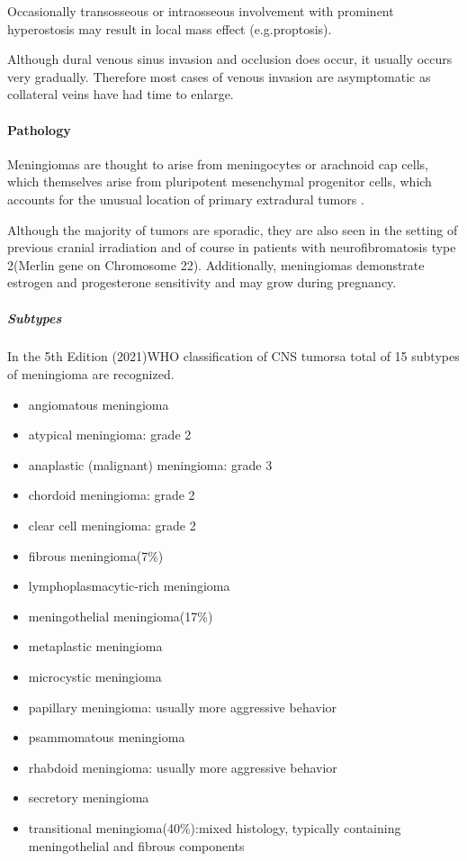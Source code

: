 Occasionally transosseous or intraosseous involvement with prominent hyperostosis may result in local mass effect (e.g.proptosis).

Although dural venous sinus invasion and occlusion does occur, it usually occurs very gradually. Therefore most cases of venous invasion are asymptomatic as collateral veins have had time to enlarge.


\paragraph{Pathology}

Meningiomas are thought to arise from meningocytes or arachnoid cap cells, which themselves arise from pluripotent mesenchymal progenitor cells, which accounts for the unusual location of primary extradural tumors .

Although the majority of tumors are sporadic, they are also seen in the setting of previous cranial irradiation and of course in patients with neurofibromatosis type 2(Merlin gene on Chromosome 22). Additionally, meningiomas demonstrate estrogen and progesterone sensitivity and may grow during pregnancy.


\subparagraph{Subtypes}

In the 5th Edition (2021)WHO classification of CNS tumorsa total of 15 subtypes of meningioma are recognized.

\begin{itemize}
	\item
	angiomatous meningioma
	\item
	atypical meningioma: grade 2
	\item
	anaplastic (malignant) meningioma: grade 3
	\item
	chordoid meningioma: grade 2
	\item
	clear cell meningioma: grade 2
	\item
	fibrous meningioma(7\%)
	\item
	lymphoplasmacytic-rich meningioma
	\item
	meningothelial meningioma(17\%)
	\item
	metaplastic meningioma
	\item
	microcystic meningioma
	\item
	papillary meningioma: usually more aggressive behavior
	\item
	psammomatous meningioma
	\item
	rhabdoid meningioma: usually more aggressive behavior
	\item
	secretory meningioma
	\item
	\hspace{0pt}transitional meningioma(40\%):mixed histology, typically containing meningothelial and fibrous components
\end{itemize}



